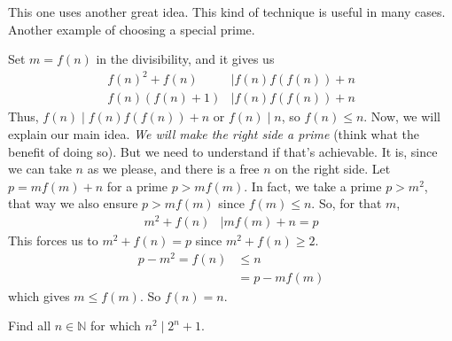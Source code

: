 \documentclass[problems.tex]{subfile}
\begin{document}
	\begin{solution}[Second]
		This one uses another great idea. This kind of technique is useful in many cases. Another example of choosing a special prime.

		Set $m=f(n)$ in the divisibility, and it gives us
		\begin{align*}
		f(n)^2+f(n) & \mid f(n)f(f(n))+n\\
		f(n)(f(n)+1)& \mid  f(n)f(f(n))+n
		\end{align*}
		Thus, $f(n)\mid f(n)f(f(n))+n$ or $f(n)\mid n$, so $f(n)\leq n$. Now, we will explain our main idea. \textit{We will make the right side a prime} (think what the benefit of doing so). But we need to understand if that's achievable. It is, since we can take $n$ as we please, and there is a free $n$ on the right side. Let $p=mf(m)+n$ for a prime $p>mf(m)$. In fact, we take a prime $p>m^2$, that way we also ensure $p>mf(m)$ since $f(m)\leq n$. So, for that $m$,
			\begin{align*}
				m^2+f(n) & \mid mf(m)+n=p
			\end{align*}
		This forces us to $m^2+f(n)=p$ since $m^2+f(n)\geq2$.
			\begin{align*}
				p-m^2 = f(n) & \leq n\\
							 & = p-mf(m)
			\end{align*}
		which gives $m\leq f(m)$. So $f(n)=n$.
	\end{solution}

	\begin{problem}
		Find all $n\in\mathbb{N}$ for which $n^2\mid 2^n+1$.
	\end{problem}
\end{document}
